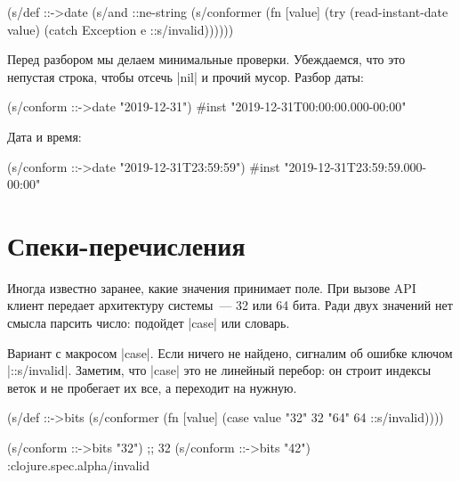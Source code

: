\begin{english}
  \begin{clojure}
(s/def ::->date
  (s/and
   ::ne-string
   (s/conformer
    (fn [value]
      (try
        (read-instant-date value)
        (catch Exception e
          ::s/invalid))))))
  \end{clojure}
\end{english}

Перед разбором мы делаем минимальные проверки. Убеждаемся, что это непустая
строка, чтобы отсечь \spverb|nil| и прочий мусор. Разбор даты:

\begin{english}
  \begin{clojure}
(s/conform ::->date "2019-12-31")
#inst "2019-12-31T00:00:00.000-00:00"
  \end{clojure}
\end{english}

\noindent
Дата и время:

\begin{english}
  \begin{clojure}
(s/conform ::->date "2019-12-31T23:59:59")
#inst "2019-12-31T23:59:59.000-00:00"
  \end{clojure}
\end{english}

\section{Спеки-перечисления}


Иногда известно заранее, какие значения принимает поле. При вызове API клиент
передает архитектуру системы~--- 32 или 64 бита. Ради двух значений нет смысла
парсить число: подойдет \spverb|case| или словарь.

Вариант с макросом \spverb|case|. Если ничего не найдено, сигналим об ошибке
ключом \spverb|::s/invalid|. Заметим, что \spverb|case| это не линейный перебор:
он строит индексы веток и не пробегает их все, а переходит на нужную.


\begin{english}
  \begin{clojure}
(s/def ::->bits
  (s/conformer
   (fn [value]
     (case value
       "32" 32
       "64" 64
       ::s/invalid))))

(s/conform ::->bits "32") ;; 32
(s/conform ::->bits "42") :clojure.spec.alpha/invalid
  \end{clojure}
\end{english}


